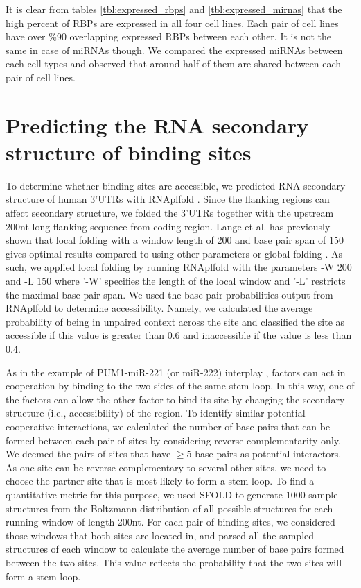 It is clear from tables \ref{tbl:expressed_rbps} and \ref{tbl:expressed_mirnas} that the high percent of RBPs are expressed in all four cell lines. Each pair of cell lines have over \%90 overlapping expressed RBPs between each other. It is not the same in case of miRNAs though. We compared the expressed miRNAs between each cell types and observed that around half of them are shared between each pair of cell lines.

\section{Predicting the RNA secondary structure of binding sites}
\label{sec:structure}
To determine whether binding sites are accessible, we predicted RNA secondary structure of human 3'UTRs with RNAplfold \cite{RNAplfold}. Since the flanking regions can affect secondary structure, we folded the 3'UTRs together with the upstream 200nt-long flanking sequence from coding region. Lange et al. has previously shown that local folding with a window length of 200 and base pair span of 150 gives optimal results compared to using other parameters or global folding \cite{lange_12}. As such, we applied local folding by running RNAplfold with the parameters $\text{-W } 200$ and $\text{-L } 150$ where '-W' specifies the length of the local window and '-L' restricts the maximal base pair span. We used the base pair probabilities output from RNAplfold to determine accessibility. Namely, we calculated the average probability of being in unpaired context across the site and classified the site as accessible if this value is greater than $0.6$ and inaccessible if the value is less than $0.4$. 

As in the example of PUM1-miR-221 (or miR-222) interplay \cite{kedde_10}, factors can act in cooperation by binding to the two sides of the same stem-loop. In this way, one of the factors can allow the other factor to bind its site by changing the secondary structure (i.e., accessibility) of the region. To identify similar potential cooperative interactions, we calculated the number of base pairs that can be formed between each pair of sites by considering reverse complementarity only. We deemed the pairs of sites that have $\geq 5$ base pairs as potential interactors. As one site can be reverse complementary to several other sites, we need to choose the partner site that is most likely to form a stem-loop. To find a quantitative metric for this purpose, we used SFOLD to generate 1000 sample structures from the Boltzmann distribution of all possible structures for each running window of length 200nt. For each pair of binding sites, we considered those windows that both sites are located in, and parsed all the sampled structures of each window to calculate the average number of base pairs formed between the two sites. This value reflects the probability that the two sites will form a stem-loop. 

